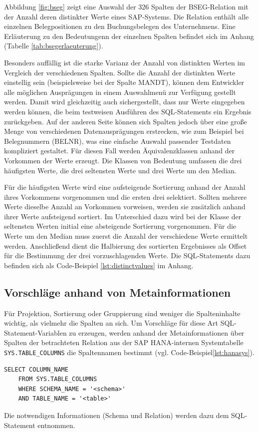 Abbildung \ref{fig:bseg} zeigt eine Auswahl der 326 Spalten der BSEG-Relation mit der Anzahl deren distinkter Werte eines SAP-Systems.
Die Relation enthält alle einzelnen Belegpositionen zu den Buchungsbelegen des Unternehmens.
Eine Erläuterung zu den Bedeutungenn der einzelnen Spalten befindet sich im Anhang (Tabelle \ref{tab:bsegerlaeuterung}).

Besonders auffällig ist die starke Varianz der Anzahl von distinkten Werten im Vergleich der verschiedenen Spalten.
Sollte die Anzahl der distinkten Werte einstellig sein (beispielsweise bei der Spalte MANDT), können dem Entwickler alle möglichen Ausprägungen in einem Auswahlmenü zur Verfügung gestellt werden.
Damit wird gleichzeitig auch sichergestellt, dass nur Werte eingegeben werden können, die beim testweisen Ausführen des SQL-Statements ein Ergebnis zurückgeben.
Auf der anderen Seite können sich Spalten jedoch über eine große Menge von verschiedenen Datenausprägungen erstrecken, wie zum Beispiel bei Belegnummern (BELNR), was eine einfache Auswahl passender Testdaten kompliziert gestaltet.
Für diesen Fall werden Äquivalenzklassen anhand der Vorkommen der Werte erzeugt. Die Klassen von Bedeutung umfassen die drei häufigsten Werte, die drei seltensten Werte und drei Werte um den Median.

Für die häufigsten Werte wird eine aufsteigende Sortierung anhand der Anzahl ihres Vorkommens vorgenommen und die ersten drei selektiert.
Sollten mehrere Werte dieselbe Anzahl an Vorkommen vorweisen, werden sie zusätzlich anhand ihrer Werte aufsteigend sortiert.
Im Unterschied dazu wird bei der Klasse der seltensten Werten initial eine absteigende Sortierung vorgenommen.
Für die Werte um den Median muss zuerst die Anzahl der verschiedene Werte ermittelt werden.
Anschließend dient die Halbierung des sortierten Ergebnisses als Offset für die Bestimmung der drei vorzuschlagenden Werte.
Die SQL-Statements dazu befinden sich als Code-Beispiel \ref{lst:distinctvalues} im Anhang.

\subsection{Vorschläge anhand von Metainformationen}\label{chap:databasemeta}
Für Projektion, Sortierung oder Gruppierung sind weniger die Spalteninhalte wichtig, als vielmehr die Spalten an sich.
Um Vorschläge für diese Art SQL-Statement-Variablen zu erzeugen, werden anhand der Metainformationen über Spalten der betrachteten Relation aus der SAP HANA-internen Systemtabelle \texttt{SYS.TABLE\_COLUMNS} die Spaltennamen bestimmt (vgl. Code-Beispiel\ref{lst:hanasys}).
\begin{lstlisting}[caption={SQL-Statement für Metainformationen zu Relationen}, label={lst:hanasys}, language=mySQL]
	SELECT COLUMN_NAME
	FROM SYS.TABLE_COLUMNS
	WHERE SCHEMA_NAME = '<schema>'
	AND TABLE_NAME = '<table>'
\end{lstlisting}
Die notwendigen Informationen (Schema und Relation) werden dazu dem SQL-Statement entnommen.

